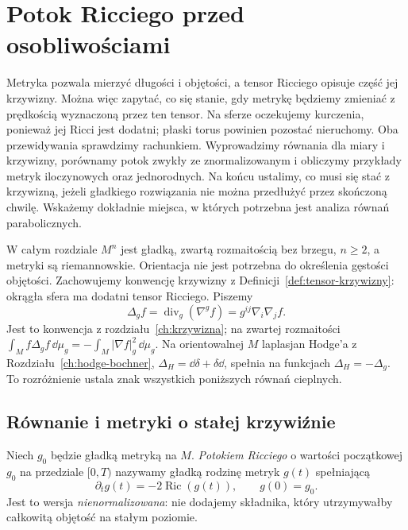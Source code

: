 \chapter{Potok Ricciego przed osobliwościami}
\label{ch:potok-ricciego}

Metryka pozwala mierzyć długości i objętości, a tensor Ricciego
opisuje część jej krzywizny. Można więc zapytać, co się stanie,
gdy metrykę będziemy zmieniać z prędkością wyznaczoną przez
ten tensor. Na sferze oczekujemy kurczenia, ponieważ jej Ricci
jest dodatni; płaski torus powinien pozostać nieruchomy.
Oba przewidywania sprawdzimy rachunkiem. Wyprowadzimy równania
dla miary i krzywizny, porównamy potok zwykły ze znormalizowanym
i obliczymy przykłady metryk iloczynowych oraz jednorodnych.
Na końcu ustalimy, co musi się stać z krzywizną, jeżeli gładkiego
rozwiązania nie można przedłużyć przez skończoną chwilę.
Wskażemy dokładnie miejsca, w których potrzebna jest analiza
równań parabolicznych.

W całym rozdziale $M^n$ jest gładką, zwartą rozmaitością bez
brzegu, $n\geq2$, a metryki są riemannowskie. Orientacja nie jest
potrzebna do określenia gęstości objętości. Zachowujemy konwencję
krzywizny z Definicji~\ref{def:tensor-krzywizny}: okrągła sfera
ma dodatni tensor Ricciego. Piszemy
\[
 \Delta_g f=\operatorname{div}_g(\nabla^g f)
            =g^{ij}\nabla_i\nabla_j f.
\]
Jest to konwencja z rozdziału~\ref{ch:krzywizna}; na zwartej
rozmaitości $\int_M f\Delta_g f\,\dd\mu_g
=-\int_M|\nabla f|_g^2\,\dd\mu_g$. Na orientowalnej $M$
laplasjan Hodge'a z Rozdziału~\ref{ch:hodge-bochner},
$\Delta_H=\dd\delta+\delta\dd$, spełnia na funkcjach
$\Delta_H=-\Delta_g$. To rozróżnienie ustala
znak wszystkich poniższych równań cieplnych.

\section{Równanie i metryki o stałej krzywiźnie}
\label{sec:ricci-flow-definition}

\begin{definicja}
\label{def:ricci-flow}
Niech $g_0$ będzie gładką metryką na $M$. \emph{Potokiem
Ricciego} o wartości początkowej $g_0$ na przedziale $[0,T)$
nazywamy gładką rodzinę metryk $g(t)$ spełniającą
\begin{equation}\label{eq:ricci-flow}
 \partial_tg(t)=-2\operatorname{Ric}(g(t)),
 \qquad g(0)=g_0.
\end{equation}
Jest to wersja \emph{nienormalizowana}: nie dodajemy składnika,
który utrzymywałby całkowitą objętość na stałym poziomie.
\end{definicja}


